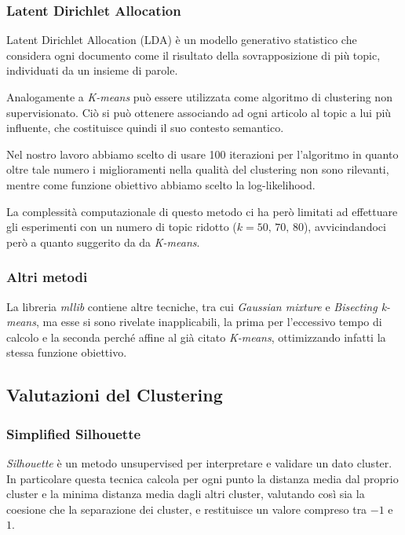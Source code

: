 \documentclass[
	11pt, %
	a4paper, %
	oneside, %
	headinclude,footinclude, %
	BCOR5mm, %
]{scrartcl}
\begin{document}
		\subsubsection{Latent Dirichlet Allocation}

			Latent Dirichlet Allocation (LDA)\cite{lda} è un modello generativo statistico che considera ogni documento come il risultato della sovrapposizione di più topic, individuati da un insieme di parole.

			Analogamente a \emph{K-means} può essere utilizzata come algoritmo di clustering non supervisionato. 
			Ciò si può ottenere associando ad ogni articolo al topic a lui più influente, che costituisce quindi il suo contesto semantico.


			Nel nostro lavoro abbiamo scelto di usare 100 iterazioni per l'algoritmo in quanto oltre tale numero i miglioramenti nella qualità del clustering non sono rilevanti\cite{ldaiterations}, mentre come funzione obiettivo abbiamo scelto la log-likelihood\cite{ldaevaluation}.

			La complessità computazionale di questo metodo ci ha però limitati ad effettuare gli esperimenti con un numero di topic ridotto ($k=50,\,70,\,80$), avvicindandoci però a quanto suggerito da da \emph{K-means}.

		\subsubsection{Altri metodi}
			La libreria \emph{mllib} contiene altre tecniche, tra cui \emph{Gaussian mixture} e \emph{Bisecting k-means}, ma esse si sono rivelate inapplicabili, la prima per l'eccessivo tempo di calcolo e la seconda perché affine al già citato \emph{K-means}, ottimizzando infatti la stessa funzione obiettivo.


	\subsection{Valutazioni del Clustering}

		\subsubsection{Simplified Silhouette}
			\emph{Silhouette} è un metodo unsupervised per interpretare e validare un dato cluster.
			In particolare questa tecnica calcola per ogni punto la distanza media dal proprio cluster e la minima distanza media dagli altri cluster, valutando così sia la coesione che la separazione dei cluster, e restituisce un valore compreso tra $-1$ e $1$.
\end{document}
